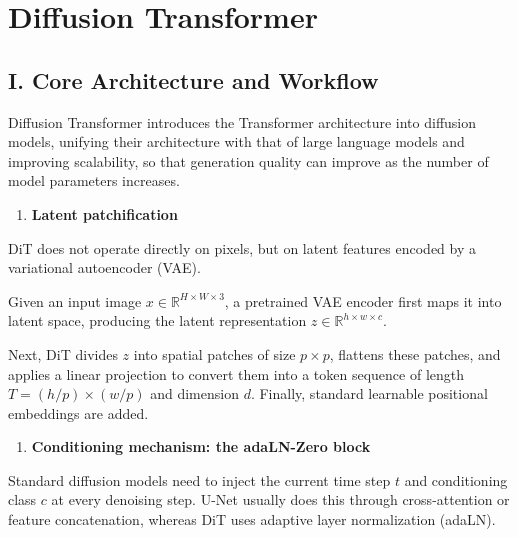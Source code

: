 \setcounter{section}{3}

\hypertarget{diffusion-transformer}{%
\section{Diffusion Transformer}\label{diffusion-transformer}}

\hypertarget{i.-core-architecture-and-workflow}{%
\subsection{I. Core Architecture and Workflow}\label{i.-core-architecture-and-workflow}}

Diffusion Transformer introduces the Transformer architecture into diffusion models, unifying their architecture with that of large language models and improving scalability, so that generation quality can improve as the number of model parameters increases.

\begin{enumerate}
\def\labelenumi{\arabic{enumi}.}
\tightlist
\item
  \textbf{Latent patchification}
\end{enumerate}

DiT does not operate directly on pixels, but on latent features encoded by a variational autoencoder (VAE).

Given an input image \(x\in\mathbb{R}^{H\times W\times 3}\), a pretrained VAE encoder first maps it into latent space, producing the latent representation \(z\in\mathbb{R}^{h\times w\times c}\).

Next, DiT divides \(z\) into spatial patches of size \(p\times p\), flattens these patches, and applies a linear projection to convert them into a token sequence of length \(T=(h/p)\times(w/p)\) and dimension \(d\). Finally, standard learnable positional embeddings are added.

\begin{enumerate}
\def\labelenumi{\arabic{enumi}.}
\setcounter{enumi}{1}
\tightlist
\item
  \textbf{Conditioning mechanism: the adaLN-Zero block}
\end{enumerate}

Standard diffusion models need to inject the current time step \(t\) and conditioning class \(c\) at every denoising step. U-Net usually does this through cross-attention or feature concatenation, whereas DiT uses adaptive layer normalization (adaLN).

